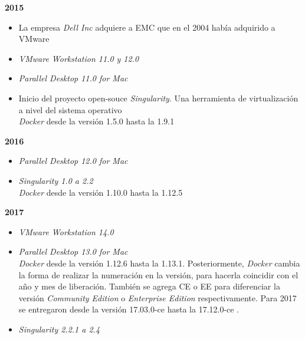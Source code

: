 \textbf{2015}\\
\begin{itemize}
	\item La empresa \textit{Dell Inc} adquiere a EMC que en el 2004 había adquirido a VMware\\
	
	\item \textit{VMware Workstation 11.0 y 12.0}\\
	
	\item \textit{Parallel Desktop 11.0 for Mac}\\	
	
	\item Inicio del proyecto open-souce \textit{Singularity}. Una herramienta de virtualización a nivel del sistema operativo\\
	
	\textit{Docker} desde la versión 1.5.0 hasta la 1.9.1\\
	
\end{itemize}


\textbf{2016}\\
\begin{itemize}
	\item \textit{Parallel Desktop 12.0 for Mac}\\	
	\item \textit{Singularity 1.0 a 2.2}\\
	
	\textit{Docker} desde la versión 1.10.0 hasta la 1.12.5\\	
\end{itemize}

\textbf{2017}\\
\begin{itemize}
	\item \textit{VMware Workstation 14.0}\\
	\item \textit{Parallel Desktop 13.0 for Mac}\\	
	
	\textit{Docker} desde la versión 1.12.6 hasta la 1.13.1. Posteriormente, \textit{Docker} cambia la forma de realizar la numeración en la versión, para hacerla coincidir con el año y mes de liberación. También se agrega CE o EE para diferenciar la versión \textit{Community Edition} o \textit{Enterprise Edition} respectivamente. Para 2017 se entregaron desde la versión 17.03.0-ce hasta la 17.12.0-ce \parencite{DockerRelease2018}.\\
	
	\item \textit{Singularity 2.2.1 a 2.4}	\\
\end{itemize}

